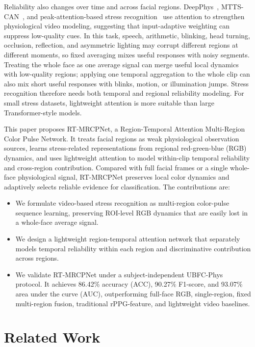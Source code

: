 \documentclass[runningheads]{llncs}
\begin{document}
Reliability also changes over time and across facial regions. DeepPhys~\cite{chen2018deepphys}, MTTS-CAN~\cite{liu2020mttscan}, and peak-attention-based stress recognition~\cite{xu2024mtasr} use attention to strengthen physiological video modeling, suggesting that input-adaptive weighting can suppress low-quality cues. In this task, speech, arithmetic, blinking, head turning, occlusion, reflection, and asymmetric lighting may corrupt different regions at different moments, so fixed averaging mixes useful responses with noisy segments. Treating the whole face as one average signal can merge useful local dynamics with low-quality regions; applying one temporal aggregation to the whole clip can also mix short useful responses with blinks, motion, or illumination jumps. Stress recognition therefore needs both temporal and regional reliability modeling. For small stress datasets, lightweight attention is more suitable than large Transformer-style models.

This paper proposes RT-MRCPNet, a Region-Temporal Attention Multi-Region Color Pulse Network. It treats facial regions as weak physiological observation sources, learns stress-related representations from regional red-green-blue (RGB) dynamics, and uses lightweight attention to model within-clip temporal reliability and cross-region contribution. Compared with full facial frames or a single whole-face physiological signal, RT-MRCPNet preserves local color dynamics and adaptively selects reliable evidence for classification. The contributions are:
\begin{itemize}
    \item We formulate video-based stress recognition as multi-region color-pulse sequence learning, preserving ROI-level RGB dynamics that are easily lost in a whole-face average signal.
    \item We design a lightweight region-temporal attention network that separately models temporal reliability within each region and discriminative contribution across regions.
    \item We validate RT-MRCPNet under a subject-independent UBFC-Phys protocol. It achieves 86.42\% accuracy (ACC), 90.27\% F1-score, and 93.07\% area under the curve (AUC), outperforming full-face RGB, single-region, fixed multi-region fusion, traditional rPPG-feature, and lightweight video baselines.
\end{itemize}

\section{Related Work}
\end{document}
